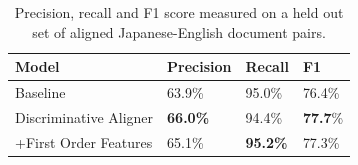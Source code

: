 \begin{table}
\begin{center}
\begin{tabular}{|l||l|l|l|}
\hline
Model & Precision & Recall & F1\\
\hline
\hline
Baseline & 63.9\% & 95.0\% & 76.4\%\\
\hline
Discriminative Aligner & {\bf 66.0\%} & 94.4\% & {\bf 77.7}\%\\
\hline
+First Order Features & 65.1\% & {\bf 95.2\%} & 77.3\%\\
\hline
\end{tabular}
\caption{Precision, recall and F1 score measured on a held out set of aligned
Japanese-English document pairs.}
\label{table:google_results}
\end{center}
\end{table}
